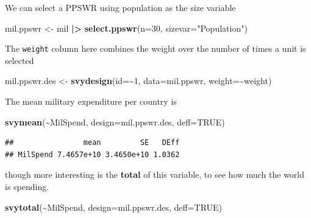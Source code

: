 \documentclass[
]{book}
\newenvironment{Shaded}{\begin{snugshade}}{\end{snugshade}}
\newcommand{\AttributeTok}[1]{\textcolor[rgb]{0.13,0.29,0.53}{#1}}
\newcommand{\ConstantTok}[1]{\textcolor[rgb]{0.56,0.35,0.01}{#1}}
\newcommand{\DecValTok}[1]{\textcolor[rgb]{0.00,0.00,0.81}{#1}}
\newcommand{\FunctionTok}[1]{\textcolor[rgb]{0.13,0.29,0.53}{\textbf{#1}}}
\newcommand{\NormalTok}[1]{#1}
\newcommand{\OtherTok}[1]{\textcolor[rgb]{0.56,0.35,0.01}{#1}}
\newcommand{\SpecialCharTok}[1]{\textcolor[rgb]{0.81,0.36,0.00}{\textbf{#1}}}
\newcommand{\StringTok}[1]{\textcolor[rgb]{0.31,0.60,0.02}{#1}}
\begin{document}
We can select a PPSWR using population as the size variable

\begin{Shaded}
\begin{Highlighting}[]
\NormalTok{mil.ppswr }\OtherTok{\textless{}{-}}\NormalTok{ mil }\SpecialCharTok{|\textgreater{}} \FunctionTok{select.ppswr}\NormalTok{(}\AttributeTok{n=}\DecValTok{30}\NormalTok{, }\AttributeTok{sizevar=}\StringTok{"Population"}\NormalTok{)}
\end{Highlighting}
\end{Shaded}

The \texttt{weight} column here combines the weight over the number of times a unit is selected

\begin{Shaded}
\begin{Highlighting}[]
\NormalTok{mil.ppswr.des }\OtherTok{\textless{}{-}} \FunctionTok{svydesign}\NormalTok{(}\AttributeTok{id=}\SpecialCharTok{\textasciitilde{}}\DecValTok{1}\NormalTok{, }\AttributeTok{data=}\NormalTok{mil.ppswr, }\AttributeTok{weight=}\SpecialCharTok{\textasciitilde{}}\NormalTok{weight)}
\end{Highlighting}
\end{Shaded}

The mean military expenditure per country is

\begin{Shaded}
\begin{Highlighting}[]
\FunctionTok{svymean}\NormalTok{(}\SpecialCharTok{\textasciitilde{}}\NormalTok{MilSpend, }\AttributeTok{design=}\NormalTok{mil.ppswr.des, }\AttributeTok{deff=}\ConstantTok{TRUE}\NormalTok{)}
\end{Highlighting}
\end{Shaded}

\begin{verbatim}
##                mean         SE   DEff
## MilSpend 7.4657e+10 3.4650e+10 1.0362
\end{verbatim}

though more interesting is the \textbf{total} of this variable, to see
how much the world is spending.

\begin{Shaded}
\begin{Highlighting}[]
\FunctionTok{svytotal}\NormalTok{(}\SpecialCharTok{\textasciitilde{}}\NormalTok{MilSpend, }\AttributeTok{design=}\NormalTok{mil.ppswr.des, }\AttributeTok{deff=}\ConstantTok{TRUE}\NormalTok{)}
\end{Highlighting}
\end{Shaded}
\end{document}

